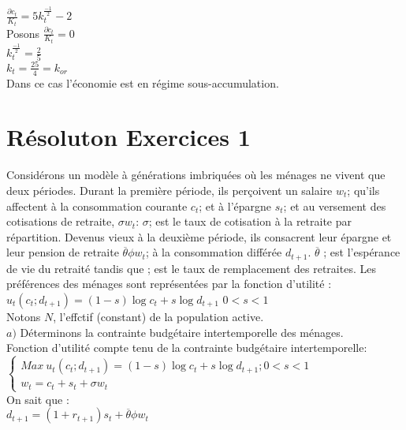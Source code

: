 \documentclass[11pt,twoside,a4paper]{article}
\begin{document}
 $\frac{\partial c_t}{K_t}=5k_t^\frac{-1}{2}-2$\\
 
  Posons $\frac{\partial c_t}{K_t}=0$\\
  $k_t^\frac{-1}{2}=\frac{2}{5}$\\
  $k_t=\frac{25}{4}=k_{or}$\\
  Dans ce cas l'économie est en régime sous-accumulation.\\
  
  \section*{Résoluton Exercices 1}
  
  Considérons un modèle à générations imbriquées où les ménages ne vivent que deux périodes. Durant la première période, ils perçoivent un salaire $w_t$; qu'ils affectent à la  consommation courante $c_t$; et à l'épargne $s_t$; et au versement des cotisations de retraite, $\sigma w_t$: $\sigma$; est le taux de cotisation à la retraite par répartition. Devenus vieux à la deuxième période, ils consacrent leur épargne et leur pension de retraite $\overline{\theta}\phi w_t$; à la consommation différée $d_{t+1}$.
$\overline{\theta}$ ; est l'espérance de vie du retraité tandis que ; est le taux de remplacement
des retraites. Les préférences des ménages sont représentées par la fonction d'utilité :\\
$u_t(c_t; d_{t+1})=(1-s)\log{c_t} + s\log{d_{t+1}}$ \: $0<s<1$
\\
Notons $N$, l'effctif (constant) de la population active.\\

$a)$ Déterminons la contrainte budgétaire intertemporelle des ménages.\\

Fonction d'utilité compte tenu de la contrainte budgétaire intertemporelle:\\

$ \left\{\begin{array}{rl}
 Max \ u_t(c_t; d_{t+1})=  (1-s)\log{c_t} + s\log{d_{t+1}} ; 0<s<1 \\
 
w_t  =  c_t + s_t +  \sigma w_t \end{array}\right. $  \\

On sait que :\\

$d_{t+1}=(1+r_{t+1})s_t+\overline{\theta}\phi w_t$\\
\end{document}
